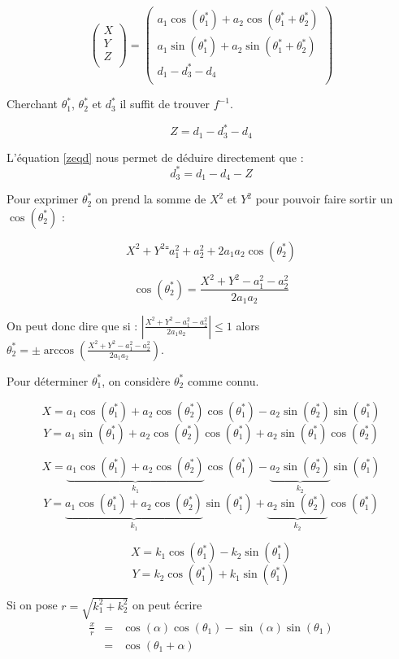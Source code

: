 \documentclass[]{article}
\begin{document}
\[
  \begin{pmatrix}
    X\\
    Y\\
    Z\\
  \end{pmatrix}
  = 
  \begin{pmatrix}
    a_1 \cos (\theta^*_1)+a_2 \cos(\theta^*_1+\theta^*_2) \\
    a_1 \sin (\theta^*_1)+a_2 \sin(\theta^*_1+\theta^*_2) \\
    d_1-d^*_3-d_4 \\
  \end{pmatrix}
\]

Cherchant $\theta^*_1$, $\theta^*_2$ et $d^*_3$ il suffit de trouver
$f^{-1}$.

\begin{equation}
  Z = d_1-d^*_3-d_4
  \label{zeqd}
\end{equation}

L'équation \eqref{zeqd} nous permet de déduire directement que : 
\[
  d^*_3 = d_1-d_4-Z
\]

Pour exprimer $\theta^*_2$ on prend la somme de $X^2$ et
$Y^2$ pour pouvoir faire sortir un $\cos(\theta^*_2)$ :

\[
  X^2 + Y^2 ⁼ a^2_1 + a^2_2 + 2 a_1 a_2 \cos(\theta^*_2) 
\]

\[ 
  \cos(\theta^*_2) = \frac{X^2+Y^2-a_1^2-a_2^2}{2 a_1 a_2} 
\]

On peut donc dire que si :
$| \frac{X^2+Y^2-a_1^2-a_2^2}{2 a_1 a_2} | \leq 1$ alors
$\theta^*_2 = \pm \arccos(\frac{X^2+Y^2-a_1^2-a_2^2}{2 a_1 a_2})$. 

Pour déterminer $\theta^*_1$, on considère $\theta^*_2$ comme connu.

\[ 
  X = a_1\cos(\theta^*_1)+a_2\cos(\theta^*_2)\cos(\theta^*_1)-a_2\sin(\theta^*_2)\sin(\theta^*_1)
\]
\[
  Y = a_1\sin(\theta^*_1)+a_2\cos(\theta^*_2)\cos(\theta^*_1)+a_2\sin(\theta^*_1)\cos(\theta^*_2)
\]

\[ 
  X = \underbrace{a_1\cos(\theta^*_1)+a_2\cos(\theta^*_2)}_{k_1}\cos(\theta^*_1)-\underbrace{a_2\sin(\theta^*_2)}_{k_2}\sin(\theta^*_1)
\]
\[
  Y = \underbrace{a_1\cos(\theta^*_1)+a_2\cos(\theta^*_2)}_{k_1}\sin(\theta^*_1)+\underbrace{a_2\sin(\theta^*_2)}_{k_2}\cos(\theta^*_1)
\]

\[ 
  X = k_1\cos(\theta^*_1)-k_2\sin(\theta^*_1)
\]
\[ 
  Y = k_2\cos(\theta^*_1)+k_1\sin(\theta^*_1)
\]

Si on pose $r = \sqrt{k_1^2+k_2^2}$ on peut écrire 
\[
\begin{array}{lcl} 
  \frac{x}{r} & = & \cos(\alpha)\cos(\theta_1)-\sin(\alpha)\sin(\theta_1)\\
  & = & \cos(\theta_1+\alpha)
\end{array}
\]
\end{document}
